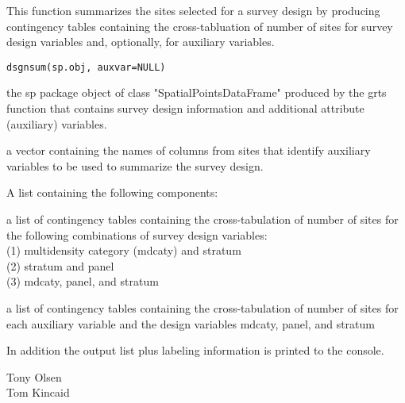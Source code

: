 \begin{Description}\relax
This function summarizes the sites selected for a survey design by producing
contingency tables containing the cross-tabluation of number of sites for
survey design variables and, optionally, for auxiliary variables.
\end{Description}
\begin{Usage}
\begin{verbatim}
dsgnsum(sp.obj, auxvar=NULL)
\end{verbatim}
\end{Usage}
\begin{Arguments}
\begin{ldescription}
\item[\code{sp.obj}] the sp package object of class "SpatialPointsDataFrame" produced
by the grts function that contains survey design information and additional
attribute (auxiliary) variables.
\item[\code{auxvar}] a vector containing the names of columns from sites that
identify auxiliary variables to be used to summarize the survey design.
\end{ldescription}
\end{Arguments}
\begin{Value}
A list containing the following components:
\begin{ldescription}
\item[\code{DesignSum}] a list of contingency tables containing the cross-tabulation
of number of sites for the following combinations of survey design
variables:\\
(1) multidensity category (mdcaty) and stratum\\
(2) stratum and panel\\
(3) mdcaty, panel, and stratum
\item[\code{AuxVarSum}] a list of contingency tables containing the cross-tabulation
of number of sites for each auxiliary variable and the design variables
mdcaty, panel, and stratum
\end{ldescription}

In addition the output list plus labeling information is printed to the
console.
\end{Value}
\begin{Author}\relax
Tony Olsen \\
Tom Kincaid 
\end{Author}
